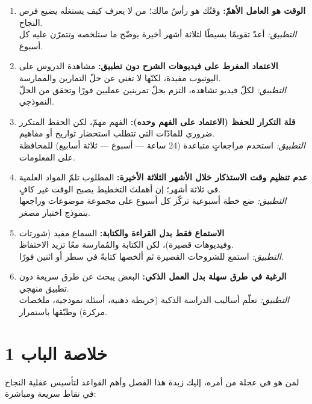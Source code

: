 \documentclass[12pt,a4paper]{book}
\begin{document}
	\begin{enumerate}
		\item \textbf{الوقت هو العامل الأهمّ:} وقتُك هو رأسُ مالك؛ من لا يعرف كيف يستغله يضيع فرص النجاح. \\
		\textit{التطبيق:} أعدّ تقويمًا بسيطًا لثلاثة أشهر أخيرة يوضّح ما ستلخصه وتتمرّن عليه كل أسبوع.
		
		\item \textbf{الاعتماد المفرط على فيديوهات الشرح دون تطبيق:} مشاهدة الدروس على اليوتيوب مفيدة، لكنّها لا تغني عن حلّ التمارين والممارسة. \\
		\textit{التطبيق:} لكلّ فيديو تشاهده، التزم بحلّ تمرينين عمليين فورًا وتحقق من الحلّ النموذجي.
		
		\item \textbf{قلة التكرار للحفظ (الاعتماد على الفهم وحده):} الفهم مهمّ، لكن الحفظ المتكرر ضروري للمادّات التي تتطلب استحضار تواريخ أو مفاهيم. \\
		\textit{التطبيق:} استخدم مراجعاتٍ متباعدة (24 ساعة — أسبوع — ثلاثة أسابيع) للمحافظة على المعلومات.
		
		\item \textbf{عدم تنظيم وقت الاستذكار خلال الأشهر الثلاثة الأخيرة:} المطلوب تلمّ المواد العلمية في ثلاثة أشهر؛ إن أهملتَ التخطيط يصبح الوقت غير كافٍ. \\
		\textit{التطبيق:} ضع خطة أسبوعية تركّز كل أسبوع على مجموعة موضوعات وراجعها بنموذج اختبار مصغر.
		
		\item \textbf{الاستماع فقط بدل القراءة والكتابة:} السماع مفيد (شورتات \\ وفيديوهات قصيرة)، لكن الكتابة والمُمارسة معًا تزيد الاحتفاظ. \\
		\textit{التطبيق:} استمع للشروحات القصيرة ثم ألخصها كتابةً في سطر أو اثنين فورًا.
		
		\item \textbf{الرغبة في طرق سهلة بدل العمل الذكي:} البعض يبحث عن طرق سريعة دون تطبيق منهجي. \\
		\textit{التطبيق:} تعلّم أساليب الدراسة الذكية (خريطة ذهنية، أسئلة نموذجية، ملخصات مركزة) وطبّقها باستمرار.
		
	\end{enumerate}
	
	\section{خلاصة الباب 1 }
	
	لمن هو في عجلة من أمره، إليك زبدة هذا الفصل وأهم القواعد لتأسيس عقلية النجاح في نقاط سريعة ومباشرة:
	
\end{document}
